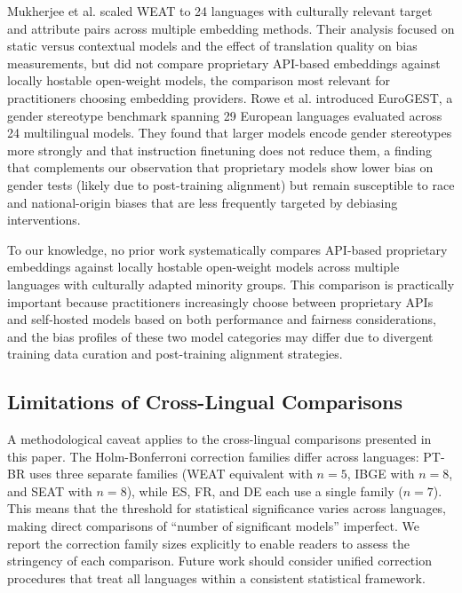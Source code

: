 \documentclass{sbc2019}
\begin{document}
Mukherjee et al. \cite{mukherjee2023global} scaled WEAT to 24 languages with culturally relevant target and attribute pairs across multiple embedding methods. Their analysis focused on static versus contextual models and the effect of translation quality on bias measurements, but did not compare proprietary API-based embeddings against locally hostable open-weight models, the comparison most relevant for practitioners choosing embedding providers. Rowe et al. \cite{rowe2025eurogest} introduced EuroGEST, a gender stereotype benchmark spanning 29 European languages evaluated across 24 multilingual models. They found that larger models encode gender stereotypes more strongly and that instruction finetuning does not reduce them, a finding that complements our observation that proprietary models show lower bias on gender tests (likely due to post-training alignment) but remain susceptible to race and national-origin biases that are less frequently targeted by debiasing interventions.

To our knowledge, no prior work systematically compares API-based proprietary embeddings against locally hostable open-weight models across multiple languages with culturally adapted minority groups. This comparison is practically important because practitioners increasingly choose between proprietary APIs and self-hosted models based on both performance and fairness considerations, and the bias profiles of these two model categories may differ due to divergent training data curation and post-training alignment strategies.

\subsection{Limitations of Cross-Lingual Comparisons}

A methodological caveat applies to the cross-lingual comparisons presented in this paper. The Holm-Bonferroni correction families differ across languages: PT-BR uses three separate families (WEAT equivalent with $n = 5$, IBGE with $n = 8$, and SEAT with $n = 8$), while ES, FR, and DE each use a single family ($n = 7$). This means that the threshold for statistical significance varies across languages, making direct comparisons of ``number of significant models'' imperfect. We report the correction family sizes explicitly to enable readers to assess the stringency of each comparison. Future work should consider unified correction procedures that treat all languages within a consistent statistical framework.
\end{document}
